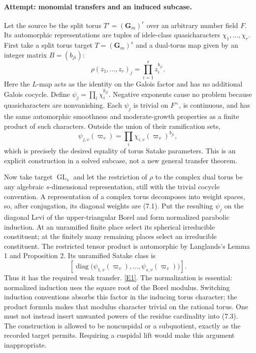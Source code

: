 \documentclass[11pt,a4paper]{article}
\newcommand{\eref}[2]{\hyperlink{extra:#1:#2}{[E#2]}}
\begin{document}
\paragraph{Attempt: monomial transfers and an induced subcase.}
Let the source be the split torus $T'=(\mathbf G_m)^r$ over an arbitrary
number field $F$. Its automorphic representations are tuples of
idele-class quasicharacters $\chi_1,\ldots,\chi_r$. First take a split
torus target $T=(\mathbf G_m)^s$ and a dual-torus map given by an integer
matrix $B=(b_{ji})$:
\[
 \rho(z_1,\ldots,z_r)_j=\prod_{i=1}^r z_i^{b_{ji}}.
 \tag{7.1}
\]
Here the $L$-map acts as the identity on the Galois factor and has no
additional Galois cocycle. Define
$\psi_j=\prod_i\chi_i^{b_{ji}}$. Negative exponents cause no problem
because quasicharacters are nonvanishing. Each $\psi_j$ is trivial on
$F^\times$, is continuous, and has the same automorphic smoothness and
moderate-growth properties as a finite product of such characters.
Outside the union of their ramification sets,
\[
 \psi_{j,v}(\varpi_v)=\prod_i\chi_{i,v}(\varpi_v)^{b_{ji}},
 \tag{7.2}
\]
which is precisely the desired equality of torus Satake parameters.
This is an explicit construction in a solved subcase, not a new general
transfer theorem.

Now take target $\operatorname{GL}_s$ and let the restriction of $\rho$
to the complex dual torus be any algebraic $s$-dimensional representation,
still with the trivial cocycle convention. A representation of a complex
torus decomposes into weight spaces, so, after conjugation, its diagonal
weights are (7.1). Put the resulting $\psi_j$ on the diagonal Levi of
the upper-triangular Borel and form normalized parabolic induction. At
an unramified finite place select its spherical irreducible constituent;
at the finitely many remaining places select an irreducible constituent.
The restricted tensor product is automorphic by Langlands's Lemma 1
and Proposition 2. Its unramified Satake class is
\[
 \left[\operatorname{diag}
  \bigl(\psi_{1,v}(\varpi_v),\ldots,\psi_{s,v}(\varpi_v)\bigr)\right].
 \tag{7.3}
\]
Thus it has the required weak transfer. \eref{statement}{1}.
The normalization is essential: normalized induction uses the square
root of the Borel modulus. Switching induction conventions absorbs this
factor in the inducing torus character; the product formula makes that
modulus character trivial on the rational torus. One must not instead
insert unwanted powers of the residue cardinality into (7.3).
The construction is allowed to be noncuspidal or a subquotient, exactly
as the recorded target permits. Requiring a cuspidal lift would make
this argument inappropriate.
\end{document}
